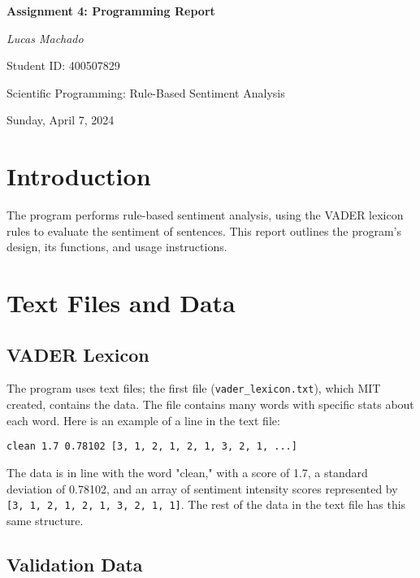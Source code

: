 \documentclass[a4paper]{article}
\begin{document}
\begin{titlepage}
    \centering
    \vspace*{\fill} 
    {\Large\bfseries Assignment 4: Programming Report \par}
    \vspace{1.5cm} 
    {\large\itshape Lucas Machado \par} 
    \vspace{0.5cm} 
    {\large Student ID: 400507829 \par}
    \vspace{1.5cm} 
    {\large Scientific Programming: Rule-Based Sentiment Analysis \par}
    \vspace{1cm} 
    {\large Sunday, April 7, 2024 \par} 
    \vspace*{\fill} 
\end{titlepage}

\section{Introduction}
The program performs rule-based sentiment analysis, using the VADER lexicon rules to evaluate the sentiment of sentences. This report outlines the program's design, its functions, and usage instructions.

\section{Text Files and Data}
\subsection{VADER Lexicon}
The program uses text files; the first file (\texttt{vader\_lexicon.txt}), which MIT created, contains the data. The file contains many words with specific stats about each word. Here is an example of a line in the text file:

\begin{verbatim}
clean 1.7 0.78102 [3, 1, 2, 1, 2, 1, 3, 2, 1, ...]
\end{verbatim}

The data is in line with the word "clean," with a score of 1.7, a standard deviation of 0.78102, and an array of sentiment intensity scores represented by \texttt{[3, 1, 2, 1, 2, 1, 3, 2, 1, 1]}. The rest of the data in the text file has this same structure.
\subsection{Validation Data}
\end{document}
